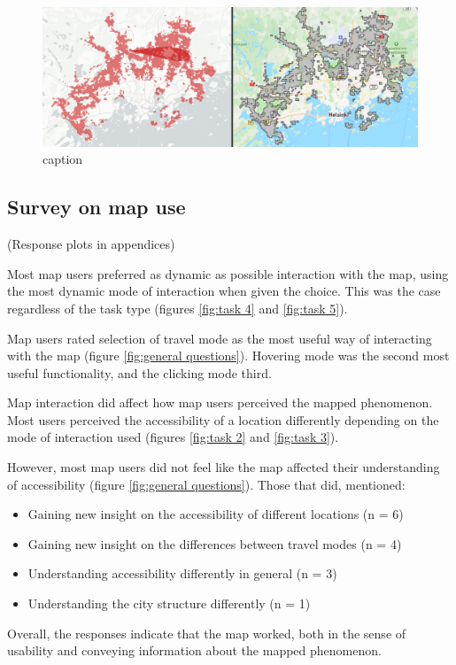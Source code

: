 

\begin{figure}[H]
	\centering
	\includegraphics[width=\textwidth]{visual/figures/screenshots/bug.png}
	\caption{caption \parencite{deckbug}}
	\label{fig:bug}
\end{figure}

\subsection{Survey on map use}

(Response plots in appendices)

Most map users preferred as dynamic as possible interaction with the map,
using the most dynamic mode of interaction when given the choice.
This was the case regardless of the task type (figures \ref{fig:task 4} and \ref{fig:task 5}).

Map users rated selection of travel mode as the most useful way of
interacting with the map (figure \ref{fig:general questions}).
Hovering mode was the second most useful functionality,
and the clicking mode third.

Map interaction did affect how map users perceived the mapped phenomenon.
Most users perceived the accessibility of a location differently depending
on the mode of interaction used (figures \ref{fig:task 2} and \ref{fig:task 3}).

However, most map users did not feel like the map affected
their understanding of accessibility (figure \ref{fig:general questions}).
Those that did, mentioned:

\begin{itemize}
	\item Gaining new insight on the accessibility of different locations (n = 6)
	\item Gaining new insight on the differences between travel modes (n = 4)
	\item Understanding accessibility differently in general (n = 3)
	\item Understanding the city structure differently (n = 1)
\end{itemize}

Overall, the responses indicate that the map worked,
both in the sense of usability and conveying information about the mapped phenomenon.

